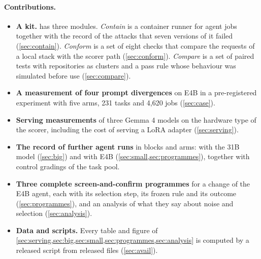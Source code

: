 \paragraph{Contributions.}
\begin{itemize}
\item \textbf{A kit.} \kit{} has three modules. \emph{Contain} is a container runner for agent jobs together with the
record of the attacks that seven versions of it failed (\cref{sec:contain}). \emph{Conform} is a set of eight checks
that compare the requests of a local stack with the scorer path (\cref{sec:conform}). \emph{Compare} is a set of paired
tests with repositories as clusters and a pass rule whose behaviour was simulated before use (\cref{sec:compare}).
\item \textbf{A measurement of four prompt divergences} on E4B in a pre-registered experiment with five arms, 231 tasks
and 4,620 jobs (\cref{sec:case}).
\item \textbf{Serving measurements} of three Gemma 4 models on the hardware type of the scorer, including the cost of
serving a LoRA adapter (\cref{sec:serving}).
\item \textbf{The record of \RunsTotal{} further agent runs} in \BlocksTotal{} blocks and \ArmsTotal{} arms:
\RunsThirtyOne{} with the 31B model (\cref{sec:big}) and \RunsEFour{} with E4B (\cref{sec:small,sec:programmes}),
together with \ControlRows{} control gradings of the task pool.
\item \textbf{Three complete screen-and-confirm programmes} for a change of the E4B agent, each with its selection
step, its frozen rule and its outcome (\cref{sec:programmes}), and an analysis of what they say about noise and
selection (\cref{sec:analysis}).
\item \textbf{Data and scripts.} Every table and figure of \cref{sec:serving,sec:big,sec:small,sec:programmes,sec:analysis}
is computed by a released script from released files (\cref{sec:avail}).
\end{itemize}

